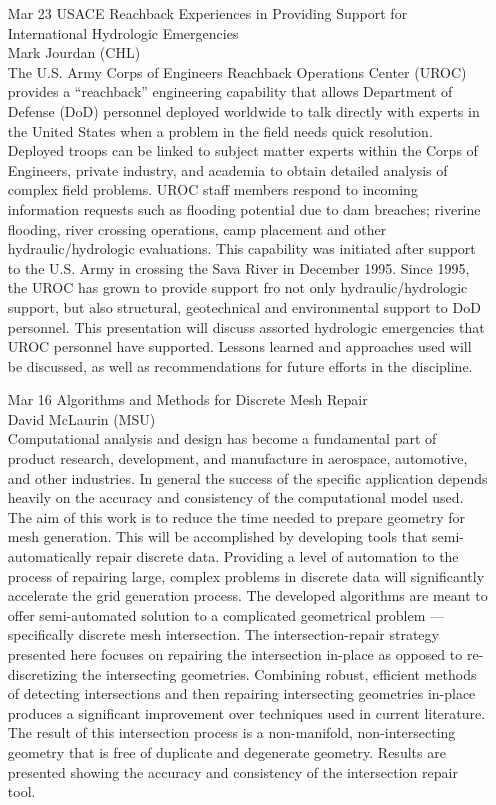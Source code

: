 \documentclass[12]{article}
\begin{document}
\begin{enumerate}
\item[Mar 23]USACE Reachback Experiences in Providing Support for International Hydrologic Emergencies\\ Mark Jourdan (CHL) \\
  The U.S. Army Corps of Engineers Reachback Operations Center (UROC)
  provides a ``reachback'' engineering capability that allows
  Department of Defense (DoD) personnel deployed worldwide to talk
  directly with experts in the United States when a problem in the
  field needs quick resolution. Deployed troops can be linked to
  subject matter experts within the Corps of Engineers, private
  industry, and academia to obtain detailed analysis of complex field
  problems. UROC staff members respond to incoming information
  requests such as flooding potential due to dam breaches; riverine
  flooding, river crossing operations, camp placement and other
  hydraulic/hydrologic evaluations.  This capability was initiated
  after support to the U.S. Army in crossing the Sava River in
  December 1995.  Since 1995, the UROC has grown to provide support
  fro not only hydraulic/hydrologic support, but also structural,
  geotechnical and environmental support to DoD personnel.  This
  presentation will discuss assorted hydrologic emergencies that UROC
  personnel have supported.  Lessons learned and approaches used will
  be discussed, as well as recommendations for future efforts in the
  discipline.

\item[Mar 16]Algorithms and Methods for Discrete Mesh Repair\\David McLaurin (MSU)\\
Computational analysis and design has become a fundamental part of product research, development, and manufacture in aerospace, automotive, and other industries.  In general the success of the specific application depends heavily on the accuracy and consistency of the computational model used.  The aim of this work is to reduce the time needed to prepare geometry for mesh generation.  This will be accomplished by developing tools that semi-automatically repair discrete data.  Providing a level of automation to the process of repairing large, complex problems in discrete data will significantly accelerate the grid generation process.  The developed algorithms are meant to offer semi-automated solution to a complicated geometrical problem — specifically discrete mesh intersection.
The intersection-repair strategy presented here focuses on repairing the intersection in-place as opposed to re-discretizing the intersecting geometries.  Combining robust, efficient methods of detecting intersections and then repairing intersecting geometries in-place produces a significant improvement over techniques used in current literature.  The result of this intersection process is a non-manifold, non-intersecting geometry that is free of duplicate and degenerate geometry.  Results are presented showing the accuracy and consistency of the intersection repair tool.


\end{enumerate}
\end{document}
